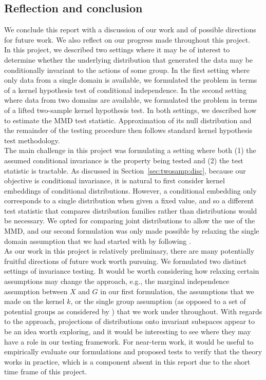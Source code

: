 \subsection{Reflection and conclusion} \label{sec:discussion}

We conclude this report with a discussion of our work and of possible directions for future work. We also reflect on our progress made throughout this project.
\\

In this project, we described two settings where it may be of interest to determine whether the underlying distribution that generated the data may be conditionally invariant to the actions of some group. In the first setting where only data from a single domain is available, we formulated the problem in terms of a kernel hypothesis test of conditional independence. In the second setting where data from two domains are available, we formulated the problem in terms of a lifted two-sample kernel hypothesis test. In both settings, we described how to estimate the MMD test statistic. Approximation of its null distribution and the remainder of the testing procedure then follows standard kernel hypothesis test methodology.
\\

The main challenge in this project was formulating a setting where both (1) the assumed conditional invariance is the property being tested and (2) the test statistic is tractable. As discussed in Section~\ref{sec:twosamp:disc}, because our objective is conditional invariance, it is natural to first consider kernel embeddings of conditional distributions. However, a conditional embedding only corresponds to a single distribution when given a fixed value, and so a different test statistic that compares distribution families rather than distributions would be necessary. We opted for comparing joint distributions to allow the use of the MMD, and our second formulation was only made possible by relaxing the single domain assumption that we had started with by following \textcite{Mouli:2021}.
\\

As our work in this project is relatively preliminary, there are many potentially fruitful directions of future work worth pursuing. We formulated two distinct settings of invariance testing. It would be worth considering how relaxing certain assumptions may change the approach, e.g., the marginal independence assumption between $X$ and $G$ in our first formulation, the assumptions that we made on the kernel $k$, or the single group assumption (as opposed to a set of potential groups as considered by \textcite{Mouli:2021}) that we work under throughout. With regards to the approach, projections of distributions onto invariant subspaces \parencite{Elesedy:2021:equivariant,Elesedy:2021,Mouli:2021} appear to be an idea worth exploring, and it would be interesting to see where they may have a role in our testing framework. For near-term work, it would be useful to empirically evaluate our formulations and proposed tests to verify that the theory works in practice, which is a component absent in this report due to the short time frame of this project.


